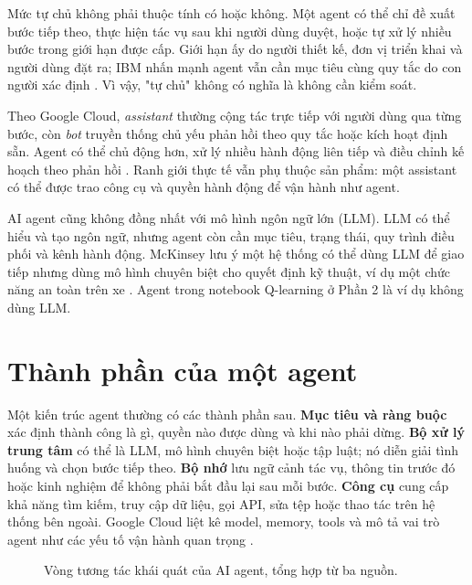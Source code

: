 \documentclass[12pt,a4paper]{report}
\begin{document}
Mức tự chủ không phải thuộc tính có hoặc không. Một agent có thể chỉ đề xuất bước
tiếp theo, thực hiện tác vụ sau khi người dùng duyệt, hoặc tự xử lý nhiều bước trong
giới hạn được cấp. Giới hạn ấy do người thiết kế, đơn vị triển khai và người dùng đặt ra;
IBM nhấn mạnh agent vẫn cần mục tiêu cùng quy tắc do con người xác định
\cite{ibm}. Vì vậy, "tự chủ" không có nghĩa là không cần kiểm soát.

Theo Google Cloud, \emph{assistant} thường cộng tác trực tiếp với người dùng qua từng
bước, còn \emph{bot} truyền thống chủ yếu phản hồi theo quy tắc hoặc kích hoạt định
sẵn. Agent có thể chủ động hơn, xử lý nhiều hành động liên tiếp và điều chỉnh kế hoạch
theo phản hồi \cite{google}. Ranh giới thực tế vẫn phụ thuộc sản phẩm: một assistant có
thể được trao công cụ và quyền hành động để vận hành như agent.

AI agent cũng không đồng nhất với mô hình ngôn ngữ lớn (LLM). LLM có thể hiểu và tạo
ngôn ngữ, nhưng agent còn cần mục tiêu, trạng thái, quy trình điều phối và kênh hành
động. McKinsey lưu ý một hệ thống có thể dùng LLM để giao tiếp nhưng dùng mô hình
chuyên biệt cho quyết định kỹ thuật, ví dụ một chức năng an toàn trên xe
\cite{mckinsey}. Agent trong notebook Q-learning ở Phần 2 là ví dụ không dùng LLM.

\section{Thành phần của một agent}
Một kiến trúc agent thường có các thành phần sau. \textbf{Mục tiêu và ràng buộc} xác
định thành công là gì, quyền nào được dùng và khi nào phải dừng. \textbf{Bộ xử lý trung
tâm} có thể là LLM, mô hình chuyên biệt hoặc tập luật; nó diễn giải tình huống và chọn
bước tiếp theo. \textbf{Bộ nhớ} lưu ngữ cảnh tác vụ, thông tin trước đó hoặc kinh nghiệm
để không phải bắt đầu lại sau mỗi bước. \textbf{Công cụ} cung cấp khả năng tìm kiếm,
truy cập dữ liệu, gọi API, sửa tệp hoặc thao tác trên hệ thống bên ngoài. Google Cloud
liệt kê model, memory, tools và mô tả vai trò agent như các yếu tố vận hành quan trọng
\cite{google}.

\begin{figure}[H]
\centering
{}
\caption{Vòng tương tác khái quát của AI agent, tổng hợp từ ba nguồn.}
\end{figure}
\end{document}
